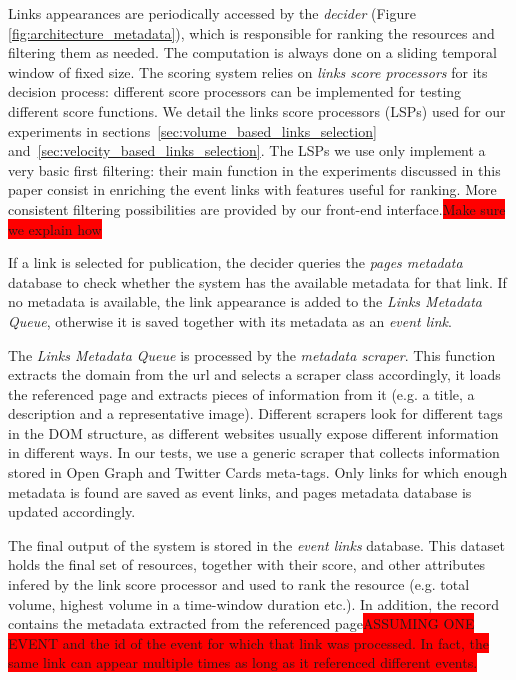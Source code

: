 \documentclass{sig-alternate}
\newcommand{\todo}[1]{\colorbox{red}{#1}}
\begin{document}
Links appearances are periodically accessed by the \emph{decider} (Figure \ref{fig:architecture_metadata}), which is responsible for ranking the resources and filtering them as needed. The computation is always done on a sliding temporal window of fixed size. The scoring system relies on \emph{links score processors} for its decision process: different score processors can be implemented for testing different score functions. We detail the links score processors (LSPs) used for our experiments in sections~\ref{sec:volume_based_links_selection} and~\ref{sec:velocity_based_links_selection}. The LSPs we use only implement a very basic first filtering: their main function in the experiments discussed in this paper consist in enriching the event links with features useful for ranking. More consistent filtering possibilities are provided by our front-end interface.\todo{Make sure we explain how}

If a link is selected for publication, the decider queries the \emph{pages metadata} database to check whether the system has the available metadata for that link. If no metadata is available, the link appearance is added to the \emph{Links Metadata Queue}, otherwise it is saved together with its metadata as an \emph{event link}. 

The \emph{Links Metadata Queue} is processed by the \emph{metadata scraper}. This function extracts the domain from the url and selects a scraper class accordingly, it loads the referenced page and extracts pieces of information from it (e.g. a title, a description and a representative image). Different scrapers look for different tags in the DOM structure, as different websites usually expose different information in different ways. In our tests, we use a generic scraper that collects information stored in Open Graph and Twitter Cards meta-tags. Only links for which enough metadata is found are saved as event links, and pages metadata database is updated accordingly. %

The final output of the system is stored in the \emph{event links} database. This dataset holds the final set of resources, together with their score, and other attributes infered by the link score processor and used to rank the resource (e.g. total volume, highest volume in a time-window duration etc.). In addition, the record contains the metadata extracted from the referenced page\todo{ASSUMING ONE EVENT and the id of the event for which that link was processed. In fact, the same link can appear multiple times as long as it referenced different events.}
\end{document}
